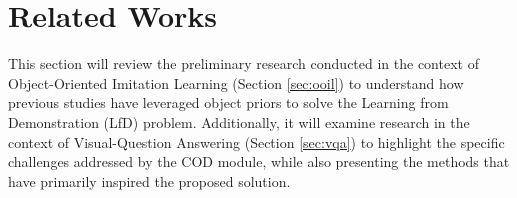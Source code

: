 \section{Related Works}
\label{sec:cod_related_works}
This section will review the preliminary research conducted in the context of Object-Oriented Imitation Learning (Section \ref{sec:ooil}) to understand how previous studies have leveraged object priors to solve the Learning from Demonstration (LfD) problem. Additionally, it will examine research in the context of Visual-Question Answering (Section \ref{sec:vqa}) to highlight the specific challenges addressed by the COD module, while also presenting the methods that have primarily inspired the proposed solution.



